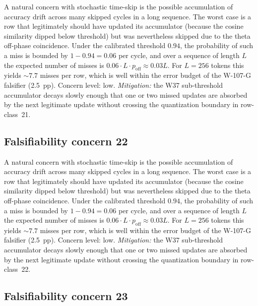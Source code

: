 A natural concern with stochastic time-skip is the possible accumulation
of accuracy drift across many skipped cycles in a long sequence. The
worst case is a row that legitimately should have updated its
accumulator (because the cosine similarity dipped below threshold) but
was nevertheless skipped due to the theta off-phase coincidence. Under
the calibrated threshold $0.94$, the probability of such a miss is
bounded by $1 - 0.94 = 0.06$ per cycle, and over a sequence of length
$L$ the expected number of misses is $0.06 \cdot L \cdot p_{\mathrm{off}}
\approx 0.03 L$. For $L = 256$ tokens this yields $\sim 7.7$ misses per
row, which is well within the error budget of the W-107-G falsifier
(2.5~pp). Concern level: low. \emph{Mitigation:} the W37 sub-threshold
accumulator decays slowly enough that one or two missed updates are
absorbed by the next legitimate update without crossing the
quantization boundary in row-class~21.


\subsection{Falsifiability concern 22}

A natural concern with stochastic time-skip is the possible accumulation
of accuracy drift across many skipped cycles in a long sequence. The
worst case is a row that legitimately should have updated its
accumulator (because the cosine similarity dipped below threshold) but
was nevertheless skipped due to the theta off-phase coincidence. Under
the calibrated threshold $0.94$, the probability of such a miss is
bounded by $1 - 0.94 = 0.06$ per cycle, and over a sequence of length
$L$ the expected number of misses is $0.06 \cdot L \cdot p_{\mathrm{off}}
\approx 0.03 L$. For $L = 256$ tokens this yields $\sim 7.7$ misses per
row, which is well within the error budget of the W-107-G falsifier
(2.5~pp). Concern level: low. \emph{Mitigation:} the W37 sub-threshold
accumulator decays slowly enough that one or two missed updates are
absorbed by the next legitimate update without crossing the
quantization boundary in row-class~22.


\subsection{Falsifiability concern 23}

